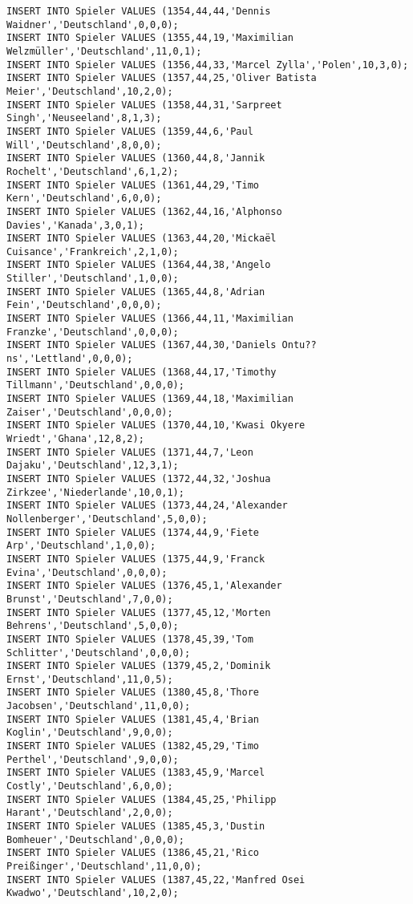 \documentclass{bschlangaul-aufgabe}
\begin{document}
\begin{verbatim}
INSERT INTO Spieler VALUES (1354,44,44,'Dennis Waidner','Deutschland',0,0,0);
INSERT INTO Spieler VALUES (1355,44,19,'Maximilian Welzmüller','Deutschland',11,0,1);
INSERT INTO Spieler VALUES (1356,44,33,'Marcel Zylla','Polen',10,3,0);
INSERT INTO Spieler VALUES (1357,44,25,'Oliver Batista Meier','Deutschland',10,2,0);
INSERT INTO Spieler VALUES (1358,44,31,'Sarpreet Singh','Neuseeland',8,1,3);
INSERT INTO Spieler VALUES (1359,44,6,'Paul Will','Deutschland',8,0,0);
INSERT INTO Spieler VALUES (1360,44,8,'Jannik Rochelt','Deutschland',6,1,2);
INSERT INTO Spieler VALUES (1361,44,29,'Timo Kern','Deutschland',6,0,0);
INSERT INTO Spieler VALUES (1362,44,16,'Alphonso Davies','Kanada',3,0,1);
INSERT INTO Spieler VALUES (1363,44,20,'Mickaël Cuisance','Frankreich',2,1,0);
INSERT INTO Spieler VALUES (1364,44,38,'Angelo Stiller','Deutschland',1,0,0);
INSERT INTO Spieler VALUES (1365,44,8,'Adrian Fein','Deutschland',0,0,0);
INSERT INTO Spieler VALUES (1366,44,11,'Maximilian Franzke','Deutschland',0,0,0);
INSERT INTO Spieler VALUES (1367,44,30,'Daniels Ontu??ns','Lettland',0,0,0);
INSERT INTO Spieler VALUES (1368,44,17,'Timothy Tillmann','Deutschland',0,0,0);
INSERT INTO Spieler VALUES (1369,44,18,'Maximilian Zaiser','Deutschland',0,0,0);
INSERT INTO Spieler VALUES (1370,44,10,'Kwasi Okyere Wriedt','Ghana',12,8,2);
INSERT INTO Spieler VALUES (1371,44,7,'Leon Dajaku','Deutschland',12,3,1);
INSERT INTO Spieler VALUES (1372,44,32,'Joshua Zirkzee','Niederlande',10,0,1);
INSERT INTO Spieler VALUES (1373,44,24,'Alexander Nollenberger','Deutschland',5,0,0);
INSERT INTO Spieler VALUES (1374,44,9,'Fiete Arp','Deutschland',1,0,0);
INSERT INTO Spieler VALUES (1375,44,9,'Franck Evina','Deutschland',0,0,0);
INSERT INTO Spieler VALUES (1376,45,1,'Alexander Brunst','Deutschland',7,0,0);
INSERT INTO Spieler VALUES (1377,45,12,'Morten Behrens','Deutschland',5,0,0);
INSERT INTO Spieler VALUES (1378,45,39,'Tom Schlitter','Deutschland',0,0,0);
INSERT INTO Spieler VALUES (1379,45,2,'Dominik Ernst','Deutschland',11,0,5);
INSERT INTO Spieler VALUES (1380,45,8,'Thore Jacobsen','Deutschland',11,0,0);
INSERT INTO Spieler VALUES (1381,45,4,'Brian Koglin','Deutschland',9,0,0);
INSERT INTO Spieler VALUES (1382,45,29,'Timo Perthel','Deutschland',9,0,0);
INSERT INTO Spieler VALUES (1383,45,9,'Marcel Costly','Deutschland',6,0,0);
INSERT INTO Spieler VALUES (1384,45,25,'Philipp Harant','Deutschland',2,0,0);
INSERT INTO Spieler VALUES (1385,45,3,'Dustin Bomheuer','Deutschland',0,0,0);
INSERT INTO Spieler VALUES (1386,45,21,'Rico Preißinger','Deutschland',11,0,0);
INSERT INTO Spieler VALUES (1387,45,22,'Manfred Osei Kwadwo','Deutschland',10,2,0);

\end{verbatim}
\end{document}
